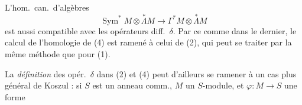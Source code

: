 \documentclass[11pt,a4paper]{article}
\begin{document}
L'hom.\ can.\ d'algèbres
\[
  \operatorname{Sym}^* M \otimes \overset{*}{\Lambda} M \longrightarrow \Gamma^* M \otimes \overset{*}{\Lambda} M
\]
est aussi compatible avec les opérateurs diff.\ $\delta$. \struck{\ill{}} Par ce   comme dans le dernier, le calcul de l'homologie de (4) est ramené à celui de (2), qui peut se traiter par la même méthode que pour (1).

La \emph{définition} des opér.\ $\delta$ dans (2) et (4) peut d'ailleurs se ramener à un cas plus général de Koszul : si $S$ est un anneau comm., $M$ un $S$-module, \struck{\ill{}} et $\varphi : M \to S$ une forme
\end{document}
